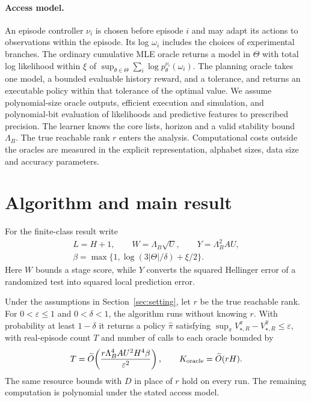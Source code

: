 \documentclass[sigconf,nonacm]{acmart}
\newcommand{\wh}{\widehat}
\newcommand{\eps}{\varepsilon}
\newcommand{\softO}{\widetilde O}
\newcommand{\st}{\star}
\newcommand{\sect}[1]{Section~\ref{#1}}
\begin{document}
\paragraph{Access model.}
An episode controller $\nu_i$ is chosen before episode $i$ and may adapt its actions to observations within the episode. Its log $\omega_i$ includes the choices of experimental branches. The ordinary cumulative MLE oracle returns a model in $\Theta$ with total log likelihood within $\xi$ of $\sup_{\theta\in\Theta}\sum_i\log p_\theta^{\nu_i}(\omega_i)$. The planning oracle takes one model, a bounded evaluable history reward, and a tolerance, and returns an executable policy within that tolerance of the optimal value. We assume polynomial-size oracle outputs, efficient execution and simulation, and polynomial-bit evaluation of likelihoods and predictive features to prescribed precision. The learner knows the core lists, horizon and a valid stability bound $\Lambda_B$. The true reachable rank $r$ enters the analysis. Computational costs outside the oracles are measured in the explicit representation, alphabet sizes, data size and accuracy parameters.

\section{Algorithm and main result}\label{sec:algorithm}
For the finite-class result write
\begin{equation}
 \begin{gathered}
 L=H+1,\qquad W=\Lambda_B\sqrt U,\qquad Y=\Lambda_B^2 A U,\\
 \beta=\max\{1,\log(3|\Theta|/\delta)+\xi/2\}.
 \end{gathered}
 \label{eq:params}
\end{equation}
Here $W$ bounds a stage score, while $Y$ converts the squared Hellinger error of a randomized test into squared local prediction error.

\begin{theorem}\label{thm:main}
Under the assumptions in \sect{sec:setting}, let $r$ be the true reachable rank. For $0<\eps\le1$ and $0<\delta<1$, the algorithm runs without knowing $r$. With probability at least $1-\delta$ it returns a policy $\wh\pi$ satisfying $\sup_\pi V_{\st,R}^\pi-V_{\st,R}^{\wh\pi}\le\eps$, with real-episode count $T$ and number of calls to each oracle bounded by
\[
 T=\softO\!\left(\frac{r\Lambda_B^4 A U^2 H^4\beta}{\eps^2}\right),
 \qquad K_{\rm oracle}=\softO(rH).
\]
The same resource bounds with $D$ in place of $r$ hold on every run. The remaining computation is polynomial under the stated access model.
\end{theorem}
\end{document}
